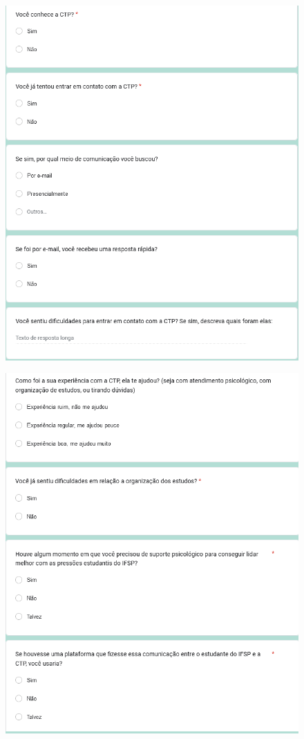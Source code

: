 \documentclass[12pt,a4paper]{article}
\begin{document}
\begin{figure}[H]
    \centering
     \includegraphics[width=15cm]{foto2.png}
\end{figure}

\begin{figure}[H]
    \centering
     \includegraphics[width=15cm]{foto3.png}
\end{figure}
\end{document}
